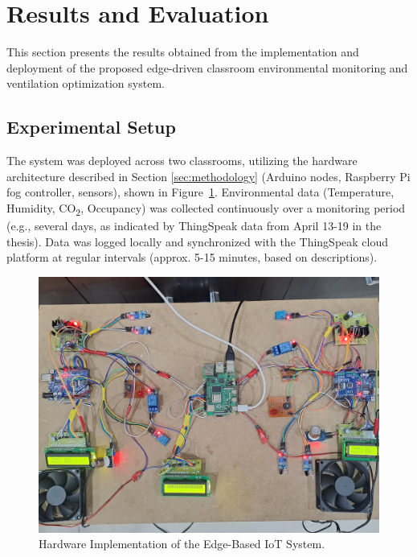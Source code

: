 \section{Results and Evaluation}
\label{sec:results}

This section presents the results obtained from the implementation and deployment of the proposed edge-driven classroom environmental monitoring and ventilation optimization system.

\subsection{Experimental Setup}
The system was deployed across two classrooms, utilizing the hardware architecture described in Section \ref{sec:methodology} (Arduino nodes, Raspberry Pi fog controller, sensors), shown in Figure~\ref{fig:hardware_photo}. Environmental data (Temperature, Humidity, CO\textsubscript{2}, Occupancy) was collected continuously over a monitoring period (e.g., several days, as indicated by ThingSpeak data from April 13-19 in the thesis). Data was logged locally and synchronized with the ThingSpeak cloud platform at regular intervals (approx. 5-15 minutes, based on descriptions).

\begin{figure}[t]
  \centering
  \includegraphics[width=\columnwidth]{figures/kit.jpg.jpeg} %
  \caption{Hardware Implementation of the Edge-Based IoT System.}
  \label{fig:hardware_photo}
\end{figure}

